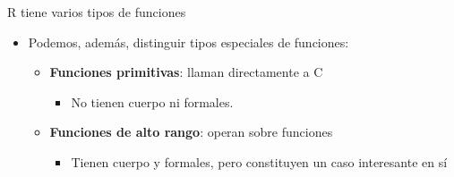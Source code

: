 \documentclass[ignorenonframetext,]{beamer}
\providecommand{\tightlist}{%
  \setlength{\itemsep}{0pt}\setlength{\parskip}{0pt}}
\begin{document}
\begin{frame}{R tiene varios tipos de funciones}
\protect\hypertarget{r-tiene-varios-tipos-de-funciones}{}

\begin{itemize}
\tightlist
\item
  Podemos, además, distinguir tipos especiales de funciones:

  \begin{itemize}
  \tightlist
  \item
    \textbf{Funciones primitivas}: llaman directamente a C

    \begin{itemize}
    \tightlist
    \item
      No tienen cuerpo ni formales.
    \end{itemize}
  \item
    \textbf{Funciones de alto rango}: operan sobre funciones

    \begin{itemize}
    \tightlist
    \item
      Tienen cuerpo y formales, pero constituyen un caso interesante en
      sí
    \end{itemize}
  \end{itemize}
\end{itemize}

\end{frame}
\end{document}
